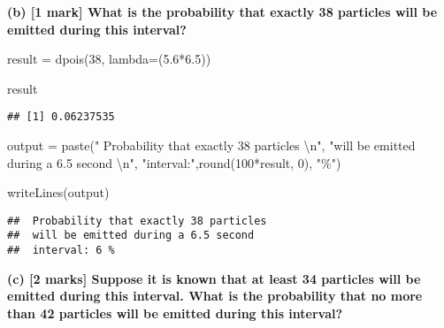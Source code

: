 \documentclass[
]{article}
\newenvironment{Shaded}{\begin{snugshade}}{\end{snugshade}}
\newcommand{\AttributeTok}[1]{\textcolor[rgb]{0.77,0.63,0.00}{#1}}
\newcommand{\DecValTok}[1]{\textcolor[rgb]{0.00,0.00,0.81}{#1}}
\newcommand{\FloatTok}[1]{\textcolor[rgb]{0.00,0.00,0.81}{#1}}
\newcommand{\FunctionTok}[1]{\textcolor[rgb]{0.00,0.00,0.00}{#1}}
\newcommand{\NormalTok}[1]{#1}
\newcommand{\OtherTok}[1]{\textcolor[rgb]{0.56,0.35,0.01}{#1}}
\newcommand{\SpecialCharTok}[1]{\textcolor[rgb]{0.00,0.00,0.00}{#1}}
\newcommand{\StringTok}[1]{\textcolor[rgb]{0.31,0.60,0.02}{#1}}
\begin{document}
\newline
\newline

\textbf{(b) {[}1 mark{]} What is the probability that exactly 38
particles will be emitted during this interval?}

\begin{Shaded}
\begin{Highlighting}[]
\NormalTok{result }\OtherTok{=} \FunctionTok{dpois}\NormalTok{(}\DecValTok{38}\NormalTok{, }\AttributeTok{lambda=}\NormalTok{(}\FloatTok{5.6}\SpecialCharTok{*}\FloatTok{6.5}\NormalTok{))}

\NormalTok{result}
\end{Highlighting}
\end{Shaded}

\begin{verbatim}
## [1] 0.06237535
\end{verbatim}

\begin{Shaded}
\begin{Highlighting}[]
\NormalTok{output }\OtherTok{=} \FunctionTok{paste}\NormalTok{(}\StringTok{" Probability that exactly 38 particles }\SpecialCharTok{\textbackslash{}n}\StringTok{"}\NormalTok{, }
               \StringTok{"will be emitted during a 6.5 second }\SpecialCharTok{\textbackslash{}n}\StringTok{"}\NormalTok{, }
               \StringTok{"interval:"}\NormalTok{,}\FunctionTok{round}\NormalTok{(}\DecValTok{100}\SpecialCharTok{*}\NormalTok{result, }\DecValTok{0}\NormalTok{), }\StringTok{"\%"}\NormalTok{)}

\FunctionTok{writeLines}\NormalTok{(output)}
\end{Highlighting}
\end{Shaded}

\begin{verbatim}
##  Probability that exactly 38 particles 
##  will be emitted during a 6.5 second 
##  interval: 6 %
\end{verbatim}

\newline
\newline

\textbf{(c) {[}2 marks{]} Suppose it is known that at least 34 particles
will be emitted during this interval. What is the probability that no
more than 42 particles will be emitted during this interval?}
\end{document}
